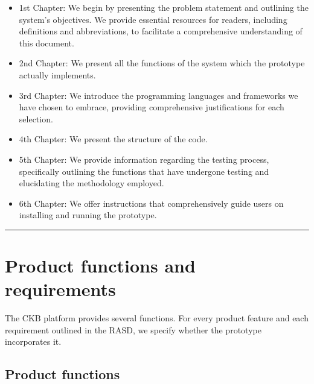 \documentclass{Configuration_Files/Template}
\begin{document}
\begin{itemize}
\item \textcolor{bluepoli}{1st Chapter:} We begin by presenting the problem statement and outlining the system's objectives. We provide essential resources for readers, including definitions and abbreviations, to facilitate a comprehensive understanding of this document.
\item \textcolor{bluepoli}{2nd Chapter:} We present all the functions of the system which the prototype actually implements.
\item \textcolor{bluepoli}{3rd Chapter:} We introduce the programming languages and frameworks we have chosen to embrace, providing comprehensive justifications for each selection.
\item \textcolor{bluepoli}{4th Chapter:} We present the structure of the code.
\item \textcolor{bluepoli}{5th Chapter:} We provide information regarding the testing process, specifically outlining the functions that have undergone testing and elucidating the methodology employed.
\item \textcolor{bluepoli}{6th Chapter:} We offer instructions that comprehensively guide users on installing and running the prototype.
\end{itemize}

{\color{bluepoli}\rule{\linewidth}{0.1pt}}

\chapter{Product functions and requirements}

The CKB platform provides several functions. For every product feature and each requirement outlined in the RASD, we specify whether the prototype incorporates it.

\section{Product functions}
\end{document}
